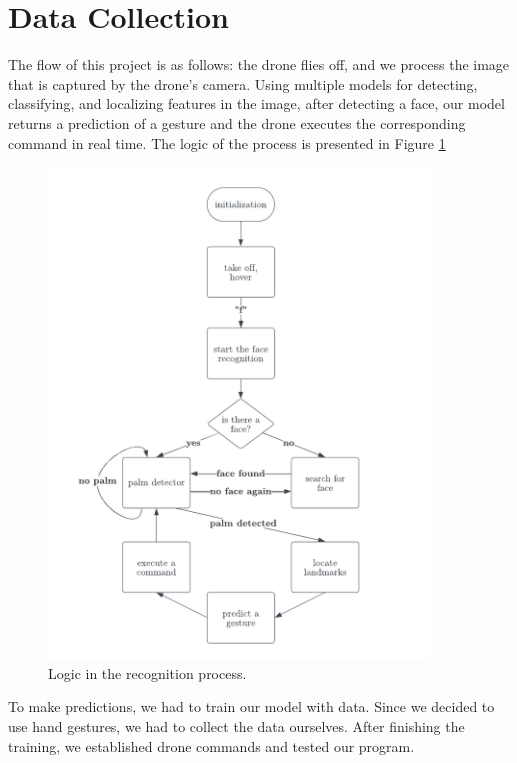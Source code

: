 \section{Data Collection}
The flow of this project is as follows: the drone flies off, and we process the image that is captured by the drone's camera. Using multiple models for detecting, classifying, and localizing features in the image, after detecting a face, our model returns a prediction of a gesture and the drone executes the corresponding command in real time. The logic of the process is presented in Figure \ref{fig:flowchart}


\begin{figure}
	\centering
	\includegraphics[width = 0.9\textwidth]{images/flowchart.pdf}
	\caption{Logic in the recognition process.}
	\label{fig:flowchart}
\end{figure}


To make predictions, we had to train our model with data. Since we decided to use hand gestures, we had to collect the data ourselves. After finishing the training, we established drone commands and tested our program.

